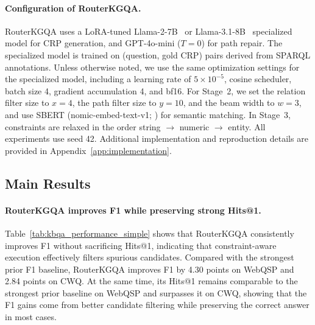\documentclass[11pt]{article}
\begin{document}
\paragraph{Configuration of RouterKGQA.}
RouterKGQA uses a LoRA-tuned Llama-2-7B~\citep{touvron2023llama2} or Llama-3.1-8B~\citep{grattafiori2024llama3} specialized model for CRP generation, and GPT-4o-mini ($T{=}0$) for path repair. The specialized model is trained on (question, gold CRP) pairs derived from SPARQL annotations. Unless otherwise noted, we use the same optimization settings for the specialized model, including a learning rate of $5\times10^{-5}$, cosine scheduler, batch size 4, gradient accumulation 4, and bf16. For Stage~2, we set the relation filter size to $x{=}4$, the path filter size to $y{=}10$, and the beam width to $w{=}3$, and use SBERT (nomic-embed-text-v1; \citealp{za-nomic-2025}) for semantic matching. In Stage~3, constraints are relaxed in the order string $\rightarrow$ numeric $\rightarrow$ entity. All experiments use seed 42. Additional implementation and reproduction details are provided in Appendix~\ref{app:implementation}.


\subsection{Main Results}
\label{sec:main_results}

\paragraph{RouterKGQA improves F1 while preserving strong Hits@1.}
Table~\ref{tab:kbqa_performance_simple} shows that RouterKGQA consistently improves F1 without sacrificing Hits@1, indicating that constraint-aware execution effectively filters spurious candidates. Compared with the strongest prior F1 baseline, RouterKGQA improves F1 by 4.30 points on WebQSP and 2.84 points on CWQ. At the same time, its Hits@1 remains comparable to the strongest prior baseline on WebQSP and surpasses it on CWQ, showing that the F1 gains come from better candidate filtering while preserving the correct answer in most cases.
\end{document}
